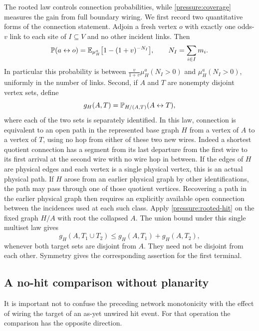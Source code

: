 The rooted law controls connection probabilities, while
\eqref{pressure:coverage} measures the gain from full boundary wiring.
We first record two quantitative forms of the connection statement.
Adjoin a fresh vertex $o$ with exactly one odds-$v$ link to each site
of $I\subseteq V$ and no other incident links. Then
\begin{equation}
 \mathbb P(a\leftrightarrow o)
 =\mathbb E_{\mu_H^a}\bigl[1-(1+v)^{-N_I}\bigr],
 \qquad N_I=\sum_{i\in I}m_i.
 \label{pressure:finite-spokes}
\end{equation}
In particular this probability is between
$\frac{v}{1+v}\mu_H^a(N_I>0)$ and $\mu_H^a(N_I>0)$, uniformly in
the number of links. Second, if $A$ and $T$ are nonempty disjoint
vertex sets, define
\begin{equation}
 g_H(A,T)=\mathbb P_{H/(A,T)}(A\leftrightarrow T),
 \label{pressure:network-g}
\end{equation}
where each of the two sets is separately identified. In this law,
connection is equivalent to an open path in the represented base
graph $H$ from a vertex of $A$ to a vertex of $T$, using no hop from
either of these two new wires. Indeed a shortest quotient connection has
a segment from its last departure from the first wire to its first
arrival at the second wire with no wire hop in between.
If the edges of $H$ are physical edges and each vertex is a single
physical vertex, this is an actual physical path. If $H$ arose from
an earlier physical graph by other identifications, the path may pass
through one of those quotient vertices. Recovering a path in the earlier
physical graph then requires an explicitly available open connection
between the incidences used at each such class.
Apply \eqref{pressure:rooted-hit} on the fixed graph $H/A$ with root
the collapsed $A$. The union bound under this single multiset law
gives
\begin{equation}
 g_H(A,T_1\cup T_2)\le g_H(A,T_1)+g_H(A,T_2),
 \label{pressure:subadditivity}
\end{equation}
whenever both target sets are disjoint from $A$. They need not be
disjoint from each other. Symmetry gives the corresponding assertion
for the first terminal.

\subsection{A no-hit comparison without planarity}

It is important not to confuse the preceding network monotonicity
with the effect of wiring the target of an as-yet unwired hit event.
For that operation the comparison has the opposite direction.

